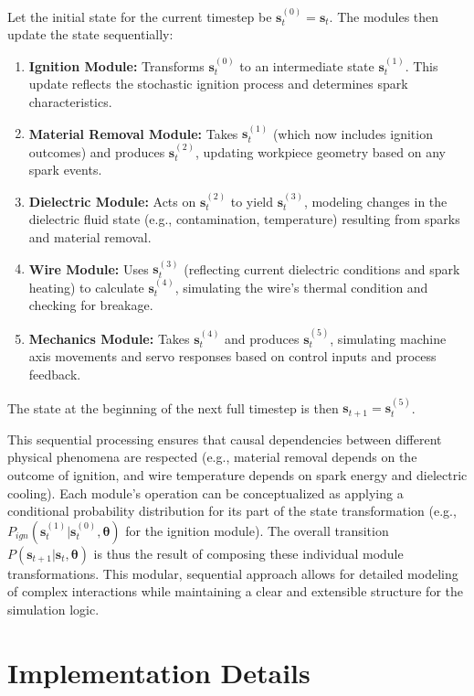 \documentclass[5p,times,procedia]{elsarticle}
\begin{document}
Let the initial state for the current timestep be $\mathbf{s}_t^{(0)} = \mathbf{s}_t$. The modules then update the state sequentially:
\begin{enumerate}
    \item \textbf{Ignition Module:} Transforms $\mathbf{s}_t^{(0)}$ to an intermediate state $\mathbf{s}_t^{(1)}$. This update reflects the stochastic ignition process and determines spark characteristics.
    \item \textbf{Material Removal Module:} Takes $\mathbf{s}_t^{(1)}$ (which now includes ignition outcomes) and produces $\mathbf{s}_t^{(2)}$, updating workpiece geometry based on any spark events.
    \item \textbf{Dielectric Module:} Acts on $\mathbf{s}_t^{(2)}$ to yield $\mathbf{s}_t^{(3)}$, modeling changes in the dielectric fluid state (e.g., contamination, temperature) resulting from sparks and material removal.
    \item \textbf{Wire Module:} Uses $\mathbf{s}_t^{(3)}$ (reflecting current dielectric conditions and spark heating) to calculate $\mathbf{s}_t^{(4)}$, simulating the wire's thermal condition and checking for breakage.
    \item \textbf{Mechanics Module:} Takes $\mathbf{s}_t^{(4)}$ and produces $\mathbf{s}_t^{(5)}$, simulating machine axis movements and servo responses based on control inputs and process feedback.
\end{enumerate}
The state at the beginning of the next full timestep is then $\mathbf{s}_{t+1} = \mathbf{s}_t^{(5)}$.

This sequential processing ensures that causal dependencies between different physical phenomena are respected (e.g., material removal depends on the outcome of ignition, and wire temperature depends on spark energy and dielectric cooling). Each module's operation can be conceptualized as applying a conditional probability distribution for its part of the state transformation (e.g., $P_{ign}(\mathbf{s}_t^{(1)}|\mathbf{s}_t^{(0)}, \boldsymbol{\theta})$ for the ignition module). The overall transition $P(\mathbf{s}_{t+1}|\mathbf{s}_t, \boldsymbol{\theta})$ is thus the result of composing these individual module transformations. This modular, sequential approach allows for detailed modeling of complex interactions while maintaining a clear and extensible structure for the simulation logic.

\section{Implementation Details}
\end{document}
